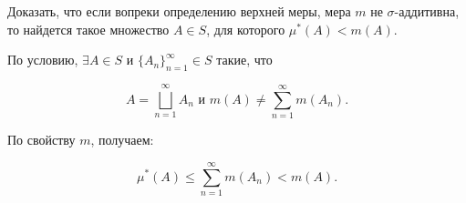 \begin{task}{1}
Доказать, что если вопреки определению верхней меры, мера $m$ не $\sigma$-аддитивна, то найдется такое множество $A \in S$, для которого $\mu^{*}(A) < m(A)$. 
\end{task}
\begin{solution}
По условию, $\exists A \in S \text{ и } \{ A_n \}_{n=1}^{\infty} \in S$ такие, что 

\begin{equation}
    A = \bigsqcup_{n=1}^{\infty}{A_n} \text{ и } m(A) \not = \sum_{n=1}^{\infty}{m(A_n)}.
\end{equation}

По свойству $m$, получаем:

\begin{equation}
    \mu^{*} (A) \leq \sum_{n=1}^{\infty}{m(A_n)} < m(A).
\end{equation}
\end{solution}
